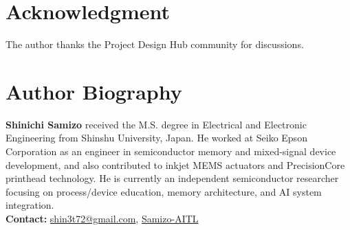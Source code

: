 \documentclass[conference]{IEEEtran}
\begin{document}
\section*{Acknowledgment}
The author thanks the Project Design Hub community for discussions.




\section*{Author Biography}
\noindent\textbf{Shinichi Samizo}
received the M.S. degree in Electrical and Electronic Engineering from Shinshu University, Japan.
He worked at Seiko Epson Corporation as an engineer in semiconductor memory and mixed-signal device development,
and also contributed to inkjet MEMS actuators and PrecisionCore printhead technology.
He is currently an independent semiconductor researcher focusing on process/device education,
memory architecture, and AI system integration.\\[2pt]
\textbf{Contact:} \href{mailto:shin3t72@gmail.com}{shin3t72@gmail.com},
\href{https://github.com/Samizo-AITL}{Samizo-AITL}
\end{document}
